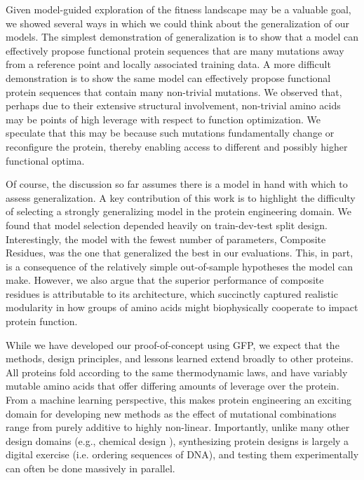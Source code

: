 Given model-guided exploration of the fitness landscape may be a valuable goal, we showed several ways in which we could think about the generalization of our models. The simplest demonstration of generalization is to show that a model can effectively propose functional protein sequences that are many mutations away from a reference point and locally associated training data.  A more difficult demonstration is to show the same model can effectively propose functional protein sequences that contain many non-trivial mutations. We observed that, perhaps due to their extensive structural involvement, non-trivial amino acids may be points of high leverage with respect to function optimization. We speculate that this may be because such mutations fundamentally change or reconfigure the protein, thereby enabling access to different and possibly higher functional optima.   

Of course, the discussion so far assumes there is a model in hand with which to assess generalization. A key contribution of this work is to highlight the difficulty of selecting a strongly generalizing model in the protein engineering domain. We found that model selection depended heavily on train-dev-test split design.  Interestingly, the model with the fewest number of parameters, Composite Residues, was the one that generalized the best in our evaluations. This, in part, is a consequence of the relatively simple out-of-sample hypotheses the model can make. However, we also argue that the superior performance of composite residues is attributable to its architecture, which succinctly captured realistic modularity in how groups of amino acids might biophysically cooperate to impact protein function.

While we have developed our proof-of-concept using GFP, we expect that the methods, design principles, and lessons learned extend broadly to other proteins. All proteins fold according to the same thermodynamic laws, and have variably mutable amino acids that offer differing amounts of leverage over the protein. From a machine learning perspective, this makes protein engineering an exciting domain for developing new methods as the effect of mutational combinations range from purely additive to highly non-linear. Importantly, unlike many other design domains (e.g., chemical design \citep{gomez2016design}), synthesizing protein designs is largely a digital exercise (i.e. ordering sequences of DNA), and testing them experimentally can often be done massively in parallel.

\vspace{-5mm}

